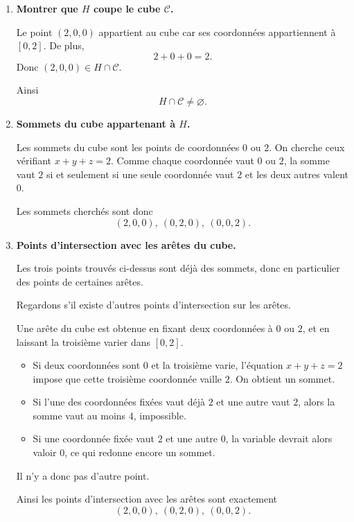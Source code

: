 \documentclass[11pt,a4paper]{article}
\newcommand{\Cube}{\mathcal{C}}
\begin{document}
\begin{enumerate}[label=\textbf{\arabic*.},resume]
    \item \textbf{Montrer que \(H\) coupe le cube \(\Cube\).}

    Le point \((2,0,0)\) appartient au cube car ses coordonnées appartiennent à \([0,2]\). De plus,
    \[
    2+0+0=2.
    \]
    Donc \((2,0,0)\in H\cap \Cube\).

    Ainsi
    \[
    \boxed{H\cap \Cube\neq\varnothing.}
    \]

    \item \textbf{Sommets du cube appartenant à \(H\).}

    Les sommets du cube sont les points de coordonnées \(0\) ou \(2\).  
    On cherche ceux vérifiant \(x+y+z=2\). Comme chaque coordonnée vaut \(0\) ou \(2\), la somme vaut \(2\) si et seulement si une seule coordonnée vaut \(2\) et les deux autres valent \(0\).

    Les sommets cherchés sont donc
    \[
    \boxed{(2,0,0),\ (0,2,0),\ (0,0,2).}
    \]

    \item \textbf{Points d'intersection avec les arêtes du cube.}

    Les trois points trouvés ci-dessus sont déjà des sommets, donc en particulier des points de certaines arêtes.

    Regardons s'il existe d'autres points d'intersection sur les arêtes.

    Une arête du cube est obtenue en fixant deux coordonnées à \(0\) ou \(2\), et en laissant la troisième varier dans \([0,2]\).

    \begin{itemize}
        \item Si deux coordonnées sont \(0\) et la troisième varie, l'équation \(x+y+z=2\) impose que cette troisième coordonnée vaille \(2\). On obtient un sommet.
        \item Si l'une des coordonnées fixées vaut déjà \(2\) et une autre vaut \(2\), alors la somme vaut au moins \(4\), impossible.
        \item Si une coordonnée fixée vaut \(2\) et une autre \(0\), la variable devrait alors valoir \(0\), ce qui redonne encore un sommet.
    \end{itemize}

    Il n'y a donc pas d'autre point.

    Ainsi les points d'intersection avec les arêtes sont exactement
    \[
    \boxed{(2,0,0),\ (0,2,0),\ (0,0,2).}
    \]


\end{enumerate}
\end{document}
